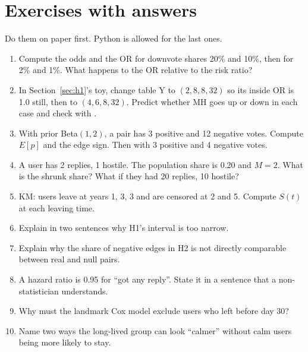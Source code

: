 \chapter{Exercises with answers}\label{app:exercises}

Do them on paper first. Python is allowed for the last ones.

\begin{enumerate}
  \item Compute the odds and the OR for downvote shares 20\% and 10\%, then for 2\% and 1\%. What happens to the OR relative to the risk ratio?
  \item In Section~\ref{sec:h1}'s toy, change table Y to $(2,8,8,32)$ so its inside OR is 1.0 still, then to $(4,6,8,32)$. Predict whether MH goes up or down in each case and check with .
  \item With prior Beta$(1,2)$, a pair has 3 positive and 12 negative votes. Compute $E[p]$ and the edge sign. Then with 3 positive and 4 negative votes.
  \item A user has 2 replies, 1 hostile. The population share is 0.20 and $M=2$. What is the shrunk share? What if they had 20 replies, 10 hostile?
  \item KM: users leave at years 1, 3, 3 and are censored at 2 and 5. Compute $S(t)$ at each leaving time.
  \item Explain in two sentences why H1's interval is too narrow.
  \item Explain why the share of negative edges in H2 is not directly comparable between real and null pairs.
  \item A hazard ratio is 0.95 for ``got any reply''. State it in a sentence that a non-statistician understands.
  \item Why must the landmark Cox model exclude users who left before day 30?
  \item Name two ways the long-lived group can look ``calmer'' without calm users being more likely to stay.
\end{enumerate}

